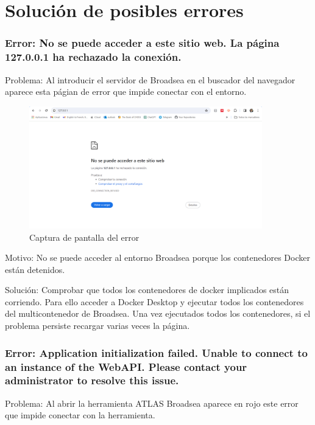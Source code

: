 \section{Solución de posibles errores}

\subsubsection{Error: No se puede acceder a este sitio web. La página 127.0.0.1 ha rechazado la conexión.}

Problema: Al introducir el servidor de Broadsea en el buscador del navegador aparece esta págian de error que impide conectar con el entorno.

\begin{figure}[H]
    \centering
    \includegraphics[width=0.90\textwidth]{figures/Error02NoSePuede.png}
     \caption{Captura de pantalla del error}
    \label{fig:Error02NoSePuede}
\end{figure}

Motivo: No se puede acceder al entorno Broadsea porque los contenedores Docker están detenidos.

Solución: Comprobar que todos los contenedores de docker implicados están corriendo. Para ello acceder a Docker Desktop y ejecutar todos los contenedores del multicontenedor de Broadsea. Una vez ejecutados todos los contenedores, si el problema persiste recargar varias veces la página.

\subsubsection{Error: Application initialization failed. Unable to connect to an instance of the WebAPI. Please contact your administrator to resolve this issue.}

Problema: Al abrir la herramienta ATLAS Broadsea aparece en rojo este error que impide conectar con la herramienta.

